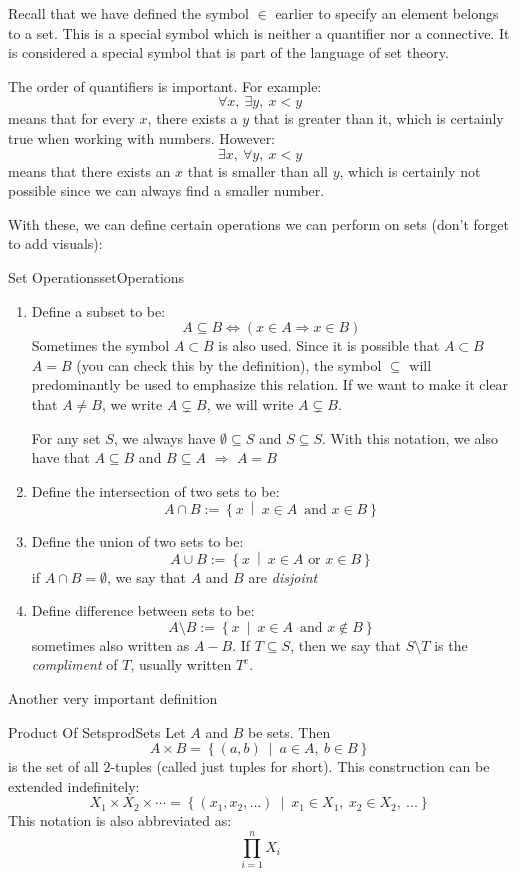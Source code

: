 \documentclass{book}
\newcommand{\sse}{\subseteq}
\newcommand{\ssne}{\subsetneq}
\newcommand{\Rw}{\Rightarrow}
\newcommand{\LRw}{\Leftrightarrow}
\newcommand{\qn}{\quad\newline}
\newcommand{\set}[2]{\left\{#1 \ \middle|\ #2\right\}}
\begin{document}
Recall that we have defined the symbol $\in$ earlier to specify an element belongs to a set. This is a special
symbol which is neither a quantifier nor a connective. It is considered a special symbol that is part of the
language of set theory.

The order of quantifiers is important. For example:
\[
	\forall x,\ \exists y,\ x < y
\]
means that for every $x$, there exists a $y$ that is greater than it, which is certainly true when working
with numbers. However:
\[
	\exists x,\ \forall y,\ x < y
\]
means that there exists an $x$ that is smaller than all $y$, which is certainly not possible since we can
always find a smaller number.

With these, we can define certain operations we can perform on sets (don't forget to add visuals):
\begin{defn}{Set Operations}{setOperations}
		\begin{enumerate}
		\item Define a subset to be:
			\[
				A \sse B \LRw (x \in A \Rw x \in B)
			\]
			Sometimes the symbol $A \subset B$ is also used. Since it is possible that $A \subset B$ $A = B$ (you can check
			this by the definition), the symbol $\sse$ will predominantly be used to emphasize this relation. If we want to make it
			clear that $A \ne B$, we write $A \subsetneq B$, we will write $A \ssne B$.

			\qn
			For any set $S$, we always have $\emptyset \sse S$ and $S \sse S$.  With this notation, we also have that $A
			\sse B$ and $B \sse A$ $\Rw$ $A = B$
		\item Define the intersection of two sets to be:
			\[
				A\cap B := \set{x}{x \in A\, \text{ and } x \in B}
			\]
		\item Define the union of two sets to be:
			\[
				A\cup B := \set{x}{x \in A \text{ or } x \in B}
			\]
			if $A \cap B = \emptyset$, we say that $A$ and $B$ are \emph{disjoint}
		\item Define difference between sets to be:
			\[
				A\setminus B := \set{x}{x \in A\, \text{ and } x\notin B}
			\]
			sometimes also written as $A - B$. If $T \sse S$, then we say that $S \setminus T$ is the \emph{compliment} of
			$T$, usually written $T^c$.
	\end{enumerate}
\end{defn}

Another very important definition

\begin{defn}{Product Of Sets}{prodSets}
	Let $A$ and $B$ be sets. Then
	\[
		A\times B = \set{(a,b)}{a \in A,\ b \in B}
	\]
	is the set of all $2$-tuples (called just tuples for short).  This construction can be extended
	indefinitely:
	\[
		X_1\times X_2\times \cdots = \set{(x_1, x_2, ...)}{x_1 \in X_1,\ x_2 \in X_2,\ ...}
	\]
	This notation is also abbreviated as:
	\[
		\prod_{i=1}^n X_i
	\]
\end{defn}
\end{document}
